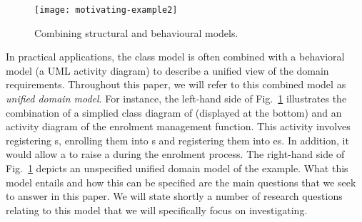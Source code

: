 \begin{figure}[th]
	\begin{center}
		\texttt{[image: motivating-example2]}
	\end{center}
	\caption{Combining structural and behavioural \courseman models.}
	\label{fig:motivatingExample2}
\end{figure}

In practical applications, the class model is often combined with a behavioral model (\eg a UML activity diagram) to describe a unified view of the domain requirements. Throughout this paper, we will refer to this combined model as \textit{unified domain model}. For instance, the left-hand side of Fig.~\ref{fig:motivatingExample2} illustrates the combination of a simplied class diagram of \courseman (displayed at the bottom) and an activity diagram of the enrolment management function. This activity involves registering s, enrolling them into s and registering them into es. In addition, it would allow a  to raise a  during the enrolment process. 
The right-hand side of Fig.~\ref{fig:motivatingExample2} depicts an unspecified unified domain model of the \courseman example. What this model entails and how this can be specified are the main questions that we seek to answer in this paper. We will state shortly a number of research questions relating to this model that we will specifically focus on investigating.




